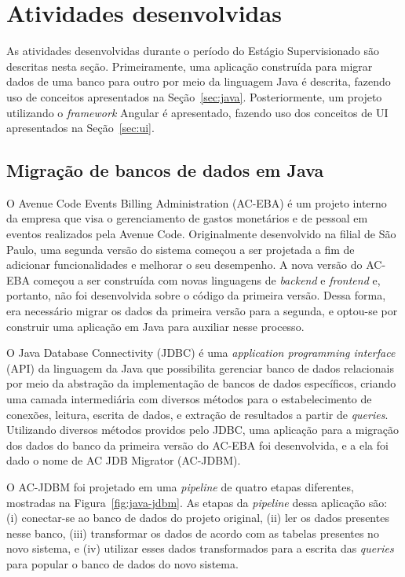 \chapter{Atividades desenvolvidas}
\label{cap:atividades-desenvolvidas}

As atividades desenvolvidas durante o período do Estágio Supervisionado são descritas nesta seção. Primeiramente, uma aplicação construída para migrar dados de uma banco para outro por meio da linguagem Java é descrita, fazendo uso de conceitos apresentados na Seção~\ref{sec:java}. Posteriormente, um projeto utilizando o \textit{framework} Angular é apresentado, fazendo uso dos conceitos de UI apresentados na Seção~\ref{sec:ui}.

\section{Migração de bancos de dados em Java}
\label{sec:java-atividades}

O Avenue Code Events Billing Administration (AC-EBA) é um projeto interno da empresa que visa o gerenciamento de gastos monetários e de pessoal em eventos realizados pela Avenue Code. Originalmente desenvolvido na filial de São Paulo, uma segunda versão do sistema começou a ser projetada a fim de adicionar funcionalidades e melhorar o seu desempenho. A nova versão do AC-EBA começou a ser construída com novas linguagens de \textit{backend} e \textit{frontend} e, portanto, não foi desenvolvida sobre o código da primeira versão. Dessa forma, era necessário migrar os dados da primeira versão para a segunda, e optou-se por construir uma aplicação em Java para auxiliar nesse processo.

O Java Database Connectivity (JDBC) é uma \textit{application programming interface} (API) da linguagem da Java que possibilita gerenciar banco de dados relacionais por meio da abstração da implementação de bancos de dados específicos, criando uma camada intermediária com diversos métodos para o estabelecimento de conexões, leitura, escrita de dados, e extração de resultados a partir de \textit{queries}. Utilizando diversos métodos providos pelo JDBC, uma aplicação para a migração dos dados do banco da primeira versão do AC-EBA foi desenvolvida, e a ela foi dado o nome de AC JDB Migrator (AC-JDBM).

O AC-JDBM foi projetado em uma \textit{pipeline} de quatro etapas diferentes, mostradas na Figura~\ref{fig:java-jdbm}. As etapas da \textit{pipeline} dessa aplicação são: (i) conectar-se ao banco de dados do projeto original, (ii) ler os dados presentes nesse banco, (iii) transformar os dados de acordo com as tabelas presentes no novo sistema, e (iv) utilizar esses dados transformados para a escrita das \textit{queries} para popular o banco de dados do novo sistema.

